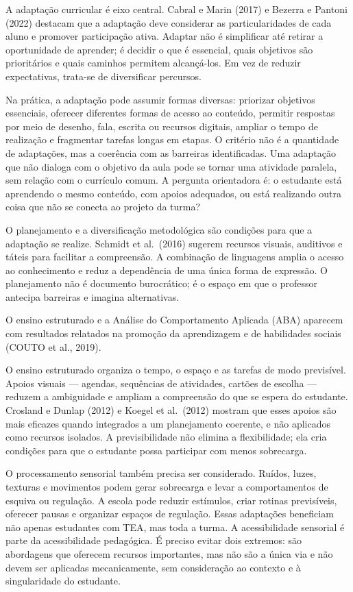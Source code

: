 A adaptação curricular é eixo central. Cabral e Marin (2017) e Bezerra e
Pantoni (2022) destacam que a adaptação deve considerar as
particularidades de cada aluno e promover participação ativa. Adaptar
não é simplificar até retirar a oportunidade de aprender; é decidir o
que é essencial, quais objetivos são prioritários e quais caminhos
permitem alcançá-los. Em vez de reduzir expectativas, trata-se de
diversificar percursos.

Na prática, a adaptação pode assumir formas diversas: priorizar
objetivos essenciais, oferecer diferentes formas de acesso ao conteúdo,
permitir respostas por meio de desenho, fala, escrita ou recursos
digitais, ampliar o tempo de realização e fragmentar tarefas longas em
etapas. O critério não é a quantidade de adaptações, mas a coerência com
as barreiras identificadas. Uma adaptação que não dialoga com o objetivo
da aula pode se tornar uma atividade paralela, sem relação com o
currículo comum. A pergunta orientadora é: o estudante está aprendendo o
mesmo conteúdo, com apoios adequados, ou está realizando outra coisa que
não se conecta ao projeto da turma?

O planejamento e a diversificação metodológica são condições para que a
adaptação se realize. Schmidt et al.~(2016) sugerem recursos visuais,
auditivos e táteis para facilitar a compreensão. A combinação de
linguagens amplia o acesso ao conhecimento e reduz a dependência de uma
única forma de expressão. O planejamento não é documento burocrático; é
o espaço em que o professor antecipa barreiras e imagina alternativas.

O ensino estruturado e a Análise do Comportamento Aplicada (ABA)
aparecem com resultados relatados na promoção da aprendizagem e de
habilidades sociais (COUTO et al., 2019).

O ensino estruturado organiza o tempo, o espaço e as tarefas de modo
previsível. Apoios visuais --- agendas, sequências de atividades,
cartões de escolha --- reduzem a ambiguidade e ampliam a compreensão do
que se espera do estudante. Crosland e Dunlap (2012) e Koegel et
al.~(2012) mostram que esses apoios são mais eficazes quando integrados
a um planejamento coerente, e não aplicados como recursos isolados. A
previsibilidade não elimina a flexibilidade; ela cria condições para que
o estudante possa participar com menos sobrecarga.

O processamento sensorial também precisa ser considerado. Ruídos, luzes,
texturas e movimentos podem gerar sobrecarga e levar a comportamentos de
esquiva ou regulação. A escola pode reduzir estímulos, criar rotinas
previsíveis, oferecer pausas e organizar espaços de regulação. Essas
adaptações beneficiam não apenas estudantes com TEA, mas toda a turma. A
acessibilidade sensorial é parte da acessibilidade pedagógica. É preciso
evitar dois extremos: são abordagens que oferecem recursos importantes,
mas não são a única via e não devem ser aplicadas mecanicamente, sem
consideração ao contexto e à singularidade do estudante.

